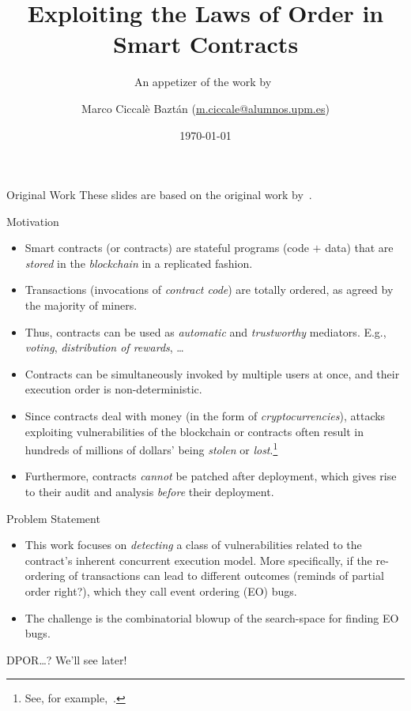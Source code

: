 \documentclass[9pt]{beamer}
\title{Exploiting the Laws of Order in Smart Contracts}
\subtitle{\small An appetizer of the work by~\citet{10.1145/3293882.3330560}}
\date{\today}
\author{Marco Ciccalè Baztán (\href{mailto:m.ciccale@alumnos.upm.es}{m.ciccale@alumnos.upm.es})}
\institute{Analysis of Concurrent and Distributed Systems,\\%
  MSc in Formal Methods in Computer Science,\\%
  Universidad Politécnica de Madrid}
\begin{document}
%
\maketitle
%
\begin{frame}{Original Work}
  \centering
  These slides are based on the original work by~\citet{10.1145/3293882.3330560}.
\end{frame}
%
\bgroup
\let\oldfootnoterule\footnoterule
\def\footnoterule{\only<4->\oldfootnoterule}
\begin{frame}{Motivation}
  \begin{itemize}
  \item \alert{Smart contracts} (or \alert{contracts}) are stateful
    programs (code $+$ data) that are \emph{stored} in the
    \emph{blockchain} in a replicated fashion.
  \pause\item \alert{Transactions} (invocations of \emph{contract code}) are
    totally ordered, as agreed by the majority of miners.
  \pause\item Thus, contracts can be used as \emph{automatic} and
    \emph{trustworthy} \alert{mediators}.
    E.g., \emph{voting}, \emph{distribution of rewards}, \ldots
  \pause\item Contracts can be simultaneously invoked by multiple users at
    once, and their execution order is \alert{non-deterministic}.
  \pause\item Since contracts deal with money (in the form of
    \emph{cryptocurrencies}), attacks exploiting vulnerabilities of
    the blockchain or contracts often result in \alert{hundreds of
      millions of dollars'} being \emph{stolen} or
    \emph{lost}.\footnote<4->{See, for example,~\citep{dao}.}
\pause\item Furthermore, contracts \emph{cannot} be \alert{patched} after
    deployment, which gives rise to their audit and analysis \emph{before}
    their deployment.
  \end{itemize}
\end{frame}
\egroup
%
\begin{frame}{Problem Statement}
  \begin{itemize}
  \item This work focuses on \emph{detecting} a class of
    vulnerabilities related to the contract's inherent
    \alert{concurrent} execution model.
    More specifically, if the re-ordering of transactions can lead to
    different outcomes (reminds of partial order right?), which they call
    \alert{event ordering} (EO) bugs.
  \pause\item The challenge is the \alert{combinatorial blowup} of
    the search-space for finding EO bugs.
  \end{itemize}
  \pause\vspace{1cm}
  \begin{center}
    \alert{DPOR}\ldots?  We'll see later!
  \end{center}
\end{frame}
\end{document}
